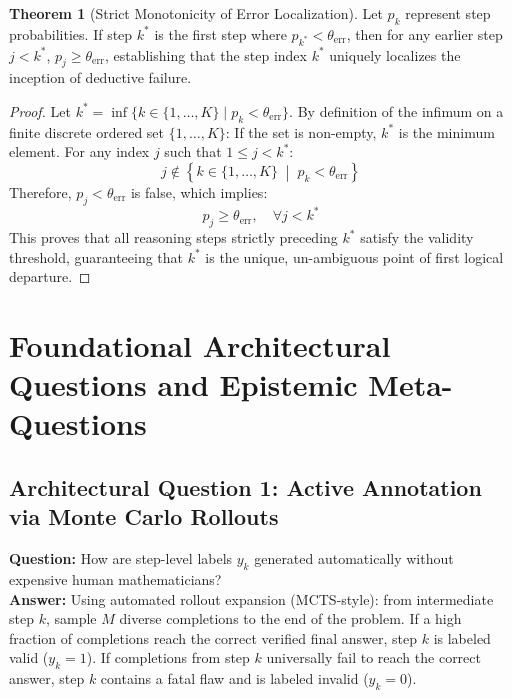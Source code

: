 \documentclass[11pt,a4paper]{article}
\theoremstyle{definition}
\newtheorem{theorem}{\textbf{Theorem}}[section]
\begin{document}
\begin{theorem}[Strict Monotonicity of Error Localization]
Let $p_k$ represent step probabilities. If step $k^*$ is the first step where $p_{k^*} < \theta_{\text{err}}$, then for any earlier step $j < k^*$, $p_j \ge \theta_{\text{err}}$, establishing that the step index $k^*$ uniquely localizes the inception of deductive failure.
\end{theorem}

\begin{proof}
Let $k^* = \inf \{k \in \{1, \dots, K\} \mid p_k < \theta_{\text{err}}\}$.
By definition of the infimum on a finite discrete ordered set $\{1, \dots, K\}$:
If the set is non-empty, $k^*$ is the minimum element.
For any index $j$ such that $1 \le j < k^*$:
{\boldmath
\begin{equation}
j \notin \left\{ k \in \{1, \dots, K\} \;\middle|\; p_k < \theta_{\text{err}} \right\}
\end{equation}
}
Therefore, $p_j < \theta_{\text{err}}$ is false, which implies:
{\boldmath
\begin{equation}
p_j \ge \theta_{\text{err}}, \quad \forall j < k^*
\end{equation}
}
This proves that all reasoning steps strictly preceding $k^*$ satisfy the validity threshold, guaranteeing that $k^*$ is the unique, un-ambiguous point of first logical departure.
\end{proof}

\section{Foundational Architectural Questions and Epistemic Meta-Questions}

\subsection{Architectural Question 1: Active Annotation via Monte Carlo Rollouts}
\textbf{Question:} How are step-level labels $y_k$ generated automatically without expensive human mathematicians?\\
\textbf{Answer:} Using automated rollout expansion (MCTS-style): from intermediate step $k$, sample $M$ diverse completions to the end of the problem. If a high fraction of completions reach the correct verified final answer, step $k$ is labeled valid ($y_k = 1$). If completions from step $k$ universally fail to reach the correct answer, step $k$ contains a fatal flaw and is labeled invalid ($y_k = 0$).
\end{document}
